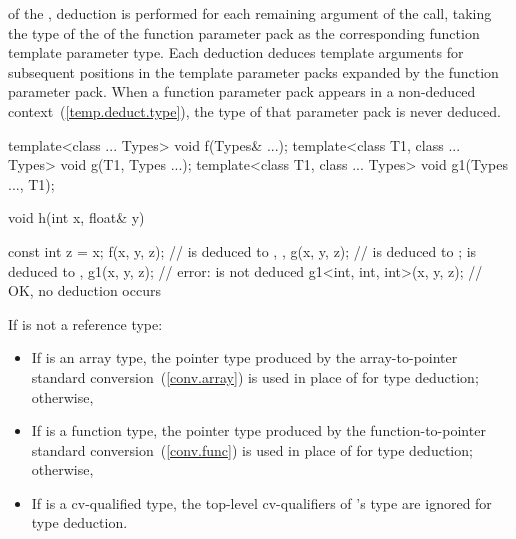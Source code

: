 of the ,
deduction is performed for each remaining argument of the call,
taking the type 
of the  of the function parameter pack
as the corresponding function template parameter type.
Each deduction deduces template arguments for subsequent positions in
the template parameter packs expanded by the function parameter pack.
When a function parameter pack appears in a non-deduced
context~(\ref{temp.deduct.type}), the type of that parameter pack is
never deduced.
\begin{example}

\begin{codeblock}
template<class ... Types> void f(Types& ...);
template<class T1, class ... Types> void g(T1, Types ...);
template<class T1, class ... Types> void g1(Types ..., T1);

void h(int x, float& y) {
  const int z = x;
  f(x, y, z);                  //  is deduced to , , 
  g(x, y, z);                  //  is deduced to ;  is deduced to , 
  g1(x, y, z);                 // error:  is not deduced
  g1<int, int, int>(x, y, z);  // OK, no deduction occurs

}
\end{codeblock}

\end{example}

\pnum
If
is not a reference type:

\begin{itemize}
\item
If
is an array type, the pointer type produced by the array-to-pointer
standard conversion~(\ref{conv.array}) is used in place of
for type deduction;
otherwise,
\item
If
is a function type, the pointer type produced by the
function-to-pointer standard conversion~(\ref{conv.func}) is used in place
of
for type
deduction; otherwise,
\item
If
is a cv-qualified type, the top-level cv-qualifiers of
's
type are ignored for type deduction.
\end{itemize}

